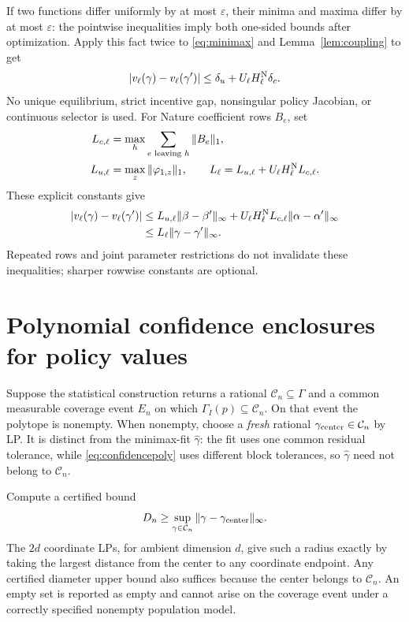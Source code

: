 \documentclass[11pt,a4paper]{article}
\numberwithin{equation}{section}
\theoremstyle{definition}
\begin{document}
If two functions differ uniformly by at most \(\varepsilon\),
their minima and maxima differ by at most \(\varepsilon\):
the pointwise inequalities imply both one-sided bounds after
optimization. Apply this fact twice to \eqref{eq:minimax} and
Lemma~\ref{lem:coupling} to get
\begin{equation}\label{eq:valuestability}
 |v_\ell(\gamma)-v_\ell(\gamma')|
                \le\delta_u+U_\ell H_\ell^{\rm N}\delta_c .
\end{equation}
No unique equilibrium, strict incentive gap, nonsingular policy
Jacobian, or continuous selector is used.
For Nature coefficient rows \(B_e\), set
\begin{equation}\label{eq:valueLipschitzconstants}
 \begin{aligned}
 L_{c,\ell}&=\max_h\sum_{e\text{ leaving }h}\|B_e\|_1,\\
 L_{u,\ell}&=\max_z\|\varphi_{1,z}\|_1,\qquad
 L_\ell=L_{u,\ell}+U_\ell H_\ell^{\rm N}L_{c,\ell}.
 \end{aligned}
\end{equation}
These explicit constants give
\begin{equation}\label{eq:valueLipschitz}
 \begin{split}
 |v_\ell(\gamma)-v_\ell(\gamma')|
 &\le L_{u,\ell}\|\beta-\beta'\|_\infty
       +U_\ell H_\ell^{\rm N}L_{c,\ell}\|\alpha-\alpha'\|_\infty\\
 &\le L_\ell\|\gamma-\gamma'\|_\infty .
 \end{split}
\end{equation}
Repeated rows and joint parameter restrictions do not invalidate
these inequalities; sharper rowwise constants are optional.

\section{Polynomial confidence enclosures for policy values}
\label{sec:valueconfidence}
Suppose the statistical construction returns a rational
\(\mathcal C_n\subseteq\Gamma\) and a common measurable coverage
event \(E_n\) on which \(\Gamma_I(p)\subseteq\mathcal C_n\).
On that event the polytope is nonempty.
When nonempty, choose a \emph{fresh} rational
\(\gamma_{\rm center}\in\mathcal C_n\) by LP.
It is distinct from the minimax-fit \(\widehat\gamma\):
the fit uses one common residual tolerance, while
\eqref{eq:confidencepoly} uses different block tolerances, so
\(\widehat\gamma\) need not belong to \(\mathcal C_n\).

Compute a certified bound
\[
 D_n\ge\sup_{\gamma\in\mathcal C_n}
                  \|\gamma-\gamma_{\rm center}\|_\infty.
\]
The \(2d\) coordinate LPs, for ambient dimension \(d\), give such
a radius exactly by taking the largest distance from the center
to any coordinate endpoint. Any certified diameter upper bound
also suffices because the center belongs to \(\mathcal C_n\).
An empty set is reported as empty and cannot arise on the coverage
event under a correctly specified nonempty population model.
\end{document}
